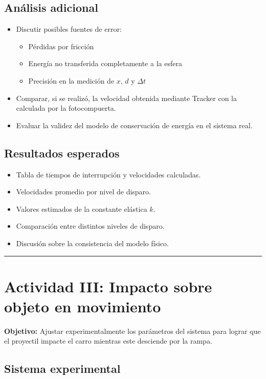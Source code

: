 \subsection*{Análisis adicional}

\begin{itemize}
\item Discutir posibles fuentes de error:
  \begin{itemize}
  \item Pérdidas por fricción
  \item Energía no transferida completamente a la esfera
  \item Precisión en la medición de $x$, $d$ y $\Delta t$
  \end{itemize}

\item Comparar, si se realizó, la velocidad obtenida mediante Tracker con la calculada por la fotocompuerta.

\item Evaluar la validez del modelo de conservación de energía en el sistema real.
\end{itemize}

\subsection*{Resultados esperados}

\begin{itemize}
\item Tabla de tiempos de interrupción y velocidades calculadas.
\item Velocidades promedio por nivel de disparo.
\item Valores estimados de la constante elástica $k$.
\item Comparación entre distintos niveles de disparo.
\item Discusión sobre la consistencia del modelo físico.
\end{itemize}

\rule{\textwidth}{1pt}

\section*{Actividad III: Impacto sobre objeto en movimiento}

\textbf{Objetivo:} Ajustar experimentalmente los parámetros del sistema para lograr que el proyectil impacte el carro mientras este desciende por la rampa.

\subsection*{Sistema experimental}

